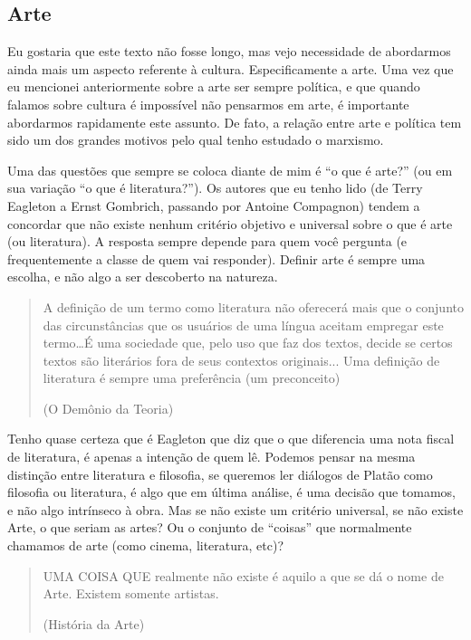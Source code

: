 \subsection{Arte}

Eu gostaria que este texto não fosse longo, mas vejo necessidade de abordarmos ainda mais um aspecto referente à cultura. Especificamente a arte. Uma vez que eu mencionei anteriormente sobre a arte ser sempre política, e que quando falamos sobre cultura é impossível não pensarmos em arte, é importante abordarmos rapidamente este assunto. De fato, a relação entre arte e política tem sido um dos grandes motivos pelo qual tenho estudado o marxismo.

Uma das questões que sempre se coloca diante de mim é “o que é arte?” (ou em sua variação “o que é literatura?”). Os autores que eu tenho lido (de Terry Eagleton a Ernst Gombrich, passando por Antoine Compagnon) tendem a concordar que não existe nenhum critério objetivo e universal sobre o que é arte (ou literatura). A resposta sempre depende para quem você pergunta (e frequentemente a classe de quem vai responder). Definir arte é sempre uma escolha, e não algo a ser descoberto na natureza.

\begin{quote}
A definição de um termo como literatura não oferecerá mais que o conjunto das circunstâncias que os usuários de uma língua aceitam empregar este termo…É uma sociedade que, pelo uso que faz dos textos, decide se certos textos são literários fora de seus contextos originais... Uma definição de literatura é sempre uma preferência (um preconceito)

(O Demônio da Teoria)
\end{quote}

Tenho quase certeza que é Eagleton que diz que o que diferencia uma nota fiscal de literatura, é apenas a intenção de quem lê. Podemos pensar na mesma distinção entre literatura e filosofia, se queremos ler diálogos de Platão como filosofia ou literatura, é algo que em última análise, é uma decisão que tomamos, e não algo intrínseco à obra. Mas se não existe um critério universal, se não existe Arte, o que seriam as artes? Ou o conjunto de “coisas” que normalmente chamamos de arte (como cinema, literatura, etc)?

\begin{quote}
UMA COISA QUE realmente não existe é aquilo a que se dá o nome de Arte. Existem somente artistas.

(História da Arte)
\end{quote}


